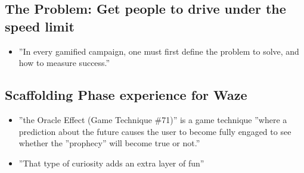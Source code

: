 \subsection{The Problem: Get people to drive under the speed limit}
\begin{itemize}
    \item ''In every gamified campaign, one must first define the problem to solve, and how to measure success.''
\end{itemize}

\subsection{Scaffolding Phase experience for Waze}
\begin{itemize}
    \item ''the Oracle Effect (Game Technique \#71)'' is a game technique ''where a prediction about the future causes the user to become fully engaged to see whether the ''prophecy'' will become true or not.''
    \item ''That type of curiosity adds an extra layer of fun''
\end{itemize}